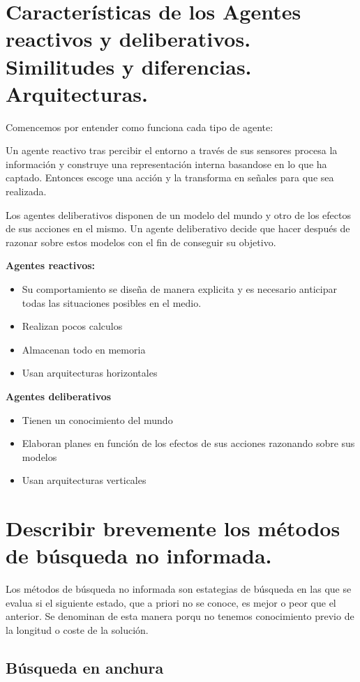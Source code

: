 \documentclass[12pt]{article}
\begin{document}
\section{Características de los Agentes reactivos y deliberativos. Similitudes y diferencias. Arquitecturas.}

Comencemos por entender como funciona cada tipo de agente:

Un agente reactivo tras percibir el entorno a través de sus sensores
procesa la información y construye una representación interna
basandose en lo que ha captado. Entonces escoge una acción y la
transforma en señales para que sea realizada.

Los agentes deliberativos disponen de un modelo del mundo y otro de
los efectos de sus acciones en el mismo. Un agente deliberativo decide
que hacer después de razonar sobre estos modelos con el fin de
conseguir su objetivo.

\textbf{Agentes reactivos:}
\begin{itemize}
\item Su comportamiento se diseña de manera explicita y es necesario
  anticipar todas las situaciones posibles en el medio.
\item Realizan pocos calculos
\item Almacenan todo en memoria
\item Usan arquitecturas horizontales
\end{itemize}

\textbf{Agentes deliberativos}
\begin{itemize}
\item Tienen un conocimiento del mundo
\item Elaboran planes en función de los efectos de sus acciones razonando sobre sus modelos
\item Usan arquitecturas verticales
\end{itemize}

\section{Describir brevemente los métodos de búsqueda no informada.}

Los métodos de búsqueda no informada son estategias de búsqueda en las
que se evalua si el siguiente estado, que a priori no se conoce, es
mejor o peor que el anterior. Se denominan de esta manera porqu no
tenemos conocimiento previo de la longitud o coste de la solución.

\subsection{Búsqueda en anchura}
\end{document}

